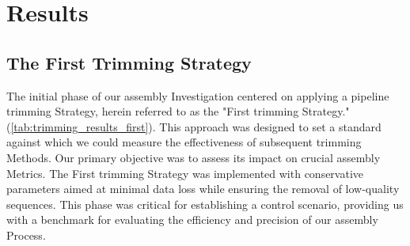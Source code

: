\chapter{Results} \label{sec:results}

\section{The First Trimming Strategy } \label{sec:1st_trimming_stratrgy}

The initial phase of our \gls{assembly} Investigation centered on applying a pipeline \gls{trimming} Strategy, herein referred to as the "First \gls{trimming} Strategy." (\autoref{tab:trimming_results_first}). This approach was designed to set a standard against which we could measure the effectiveness of subsequent \gls{trimming} Methods. Our primary objective was to assess its impact on crucial \gls{assembly} Metrics. The First \gls{trimming} Strategy was implemented with conservative parameters aimed at minimal data loss while ensuring the removal of low-quality sequences. This phase was critical for establishing a control scenario, providing us with a benchmark for evaluating the efficiency and precision of our \gls{assembly} Process.

